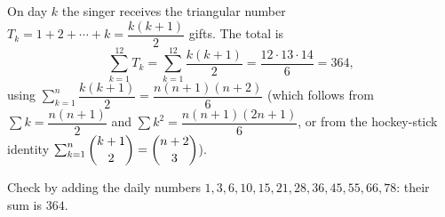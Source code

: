 On day $k$ the singer receives the triangular number $T_k=1+2+\cdots+k=\dfrac{k(k+1)}{2}$ gifts. The total is
\[\sum_{k=1}^{12}T_k=\sum_{k=1}^{12}\dfrac{k(k+1)}{2}=\dfrac{12\cdot13\cdot14}{6}=\boxed{364},\]
using $\displaystyle\sum_{k=1}^{n}\dfrac{k(k+1)}2=\dfrac{n(n+1)(n+2)}{6}$ (which follows from $\sum k=\dfrac{n(n+1)}2$ and $\sum k^2=\dfrac{n(n+1)(2n+1)}6$, or from the hockey-stick identity $\sum_{k=1}^{n}\dbinom{k+1}{2}=\dbinom{n+2}{3}$).

Check by adding the daily numbers $1,3,6,10,15,21,28,36,45,55,66,78$: their sum is $364$.

